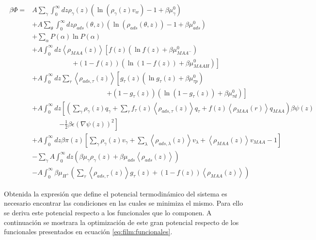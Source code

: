 \begin{align}
	\begin{aligned}
		\beta \Phi=  & A\sum_{\gamma}\int_0^\infty{dz\rho_\gamma(z)\left(\ln \left(\rho_\gamma (z)v_w\right) -1 + \beta\mu^0_\gamma\right)} \\
		&+ A\sum_{\theta}\int_0^\infty{dz\rho_{ads}(\theta,z)\left(\ln \left(\rho_{ads}(\theta,z)\right) -1 + \beta\mu^0_{ads} \right)} \\
		&+ \sum_\alpha{P(\alpha)\ln P(\alpha)} \\
		& + A\int_0^\infty dz \left<\rho_{MAA}(z)\right> \left[f(z)(\ln f(z)+ \beta\mu^0_{MAA^-})\right.\\
		& \qquad\qquad\qquad \left.+(1-f(z))(\ln (1-f(z))+\beta\mu^0_{MAAH})\right] \\
		& + A\int_0^\infty dz \sum_\tau \left<\rho_{ads,\tau}(z)\right> \left[g_\tau(z)(\ln g_\tau(z)+ \beta\mu^0_{\tau p})\right.\\
		&\qquad \qquad \qquad\qquad \qquad\quad \left.+(1-g_\tau(z))(\ln (1-g_\tau(z))+\beta\mu^0_{\tau d})\right]   \\
		& +A\int_0^\infty dz \left[\left(\sum_{\gamma } {\rho_\gamma(z) q_\gamma + \sum_\tau{f_\tau(z) \left<\rho_{ads,\tau}(z)\right> q_\tau} +  f(z) \left<\rho_{MAA}(r)\right>q_{MAA}}\right)\beta\psi(z) \right. \\ & \qquad \qquad \left.-\frac{1}{2}\beta\epsilon(\nabla\psi(z))^2 \right] \\ 
		& +A \int_0^\infty dz\beta\pi(z){\left[\sum_{\gamma}\rho_\gamma(z) v_\gamma + \sum_\lambda{\left<\rho_{ads,\lambda}(z)\right>v_\lambda} + \left<\rho_{MAA}(z)\right>v_{MAA} -1 \right]} \\
		&   -\sum_\gamma A\int_0^\infty dz \left(\beta \mu_\gamma \rho_\gamma(z) + \beta \mu_{ads} \left<\rho_{ads}(z)\right> \right)  \\
		&  -A\int_0^\infty \beta\mu_{H^+} \left( \sum_\tau\left< \rho_{ads,\tau}(z) \right>g_\tau(z) + (1-f(z)) \left< \rho_{MAA}(z) \right> \right )
	\end{aligned}
\end{align}
 
Obtenida la expresi\'on que define el potencial termodin\'amico del sistema es necesario encontrar las condiciones en las cuales se minimiza el mismo. Para ello se deriva este potencial respecto a los funcionales que lo componen.
A continuaci\'on se mostrara la optimizaci\'on de este gran potencial respecto de los funcionales presentados en  ecuaci\'on \ref{eq:film:funcionales}.

